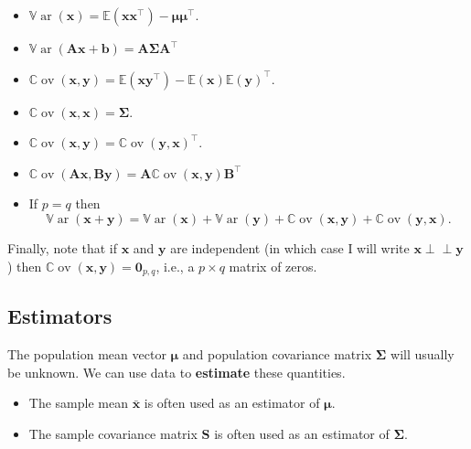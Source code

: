 \documentclass[
]{book}
\providecommand{\tightlist}{%
  \setlength{\itemsep}{0pt}\setlength{\parskip}{0pt}}
\theoremstyle{definition}
\theoremstyle{definition}
\theoremstyle{definition}
\theoremstyle{definition}
\theoremstyle{remark}
\begin{document}
\begin{itemize}
\tightlist
\item
  \({\mathbb{V}\operatorname{ar}}(\mathbf x) = {\mathbb{E}}(\mathbf x\mathbf x^\top) - {\boldsymbol{\mu}}{\boldsymbol{\mu}}^\top\).
\item
  \({\mathbb{V}\operatorname{ar}}(\mathbf A\mathbf x+ \mathbf b) = \mathbf A\boldsymbol{\Sigma}\mathbf A^\top\)
\item
  \({\mathbb{C}\operatorname{ov}}(\mathbf x,\mathbf y) = {\mathbb{E}}(\mathbf x\mathbf y^\top) - {\mathbb{E}}(\mathbf x) {\mathbb{E}}(\mathbf y)^\top\).
\item
  \({\mathbb{C}\operatorname{ov}}(\mathbf x,\mathbf x) = \boldsymbol{\Sigma}\).
\item
  \({\mathbb{C}\operatorname{ov}}(\mathbf x,\mathbf y) = {\mathbb{C}\operatorname{ov}}(\mathbf y,\mathbf x)^\top\).
\item
  \({\mathbb{C}\operatorname{ov}}(\mathbf A\mathbf x,\mathbf B\mathbf y) = \mathbf A{\mathbb{C}\operatorname{ov}}(\mathbf x,\mathbf y)\mathbf B^\top\)
\item
  If \(p=q\) then
  \[
  {\mathbb{V}\operatorname{ar}}(\mathbf x+ \mathbf y) = {\mathbb{V}\operatorname{ar}}(\mathbf x) + {\mathbb{V}\operatorname{ar}}(\mathbf y) + {\mathbb{C}\operatorname{ov}}(\mathbf x,\mathbf y) + {\mathbb{C}\operatorname{ov}}(\mathbf y,\mathbf x).
  \]
\end{itemize}

Finally, note that if \(\mathbf x\) and \(\mathbf y\) are independent (in which case I will write \(\mathbf x\perp \!\!\! \perp\mathbf y\)) then \({\mathbb{C}\operatorname{ov}}(\mathbf x,\mathbf y) = {\mathbf 0}_{p,q}\), i.e., a \(p\times q\) matrix of zeros.

\subsection{Estimators}\label{estimators}

The population mean vector \({\boldsymbol{\mu}}\) and population covariance matrix \(\boldsymbol{\Sigma}\) will usually be unknown. We can use data to \textbf{estimate} these quantities.

\begin{itemize}
\tightlist
\item
  The sample mean \(\bar{\mathbf x}\) is often used as an estimator of \({\boldsymbol{\mu}}\).
\item
  The sample covariance matrix \(\mathbf S\) is often used as an estimator of \(\boldsymbol{\Sigma}\).
\end{itemize}
\end{document}
